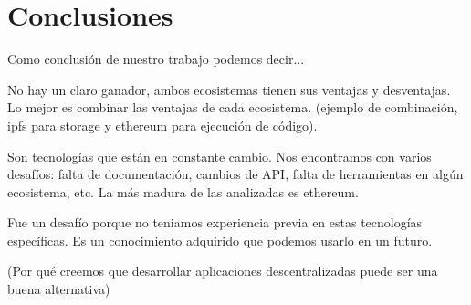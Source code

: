 \section{Conclusiones}

Como conclusión de nuestro trabajo podemos decir... 

No hay un claro ganador, ambos ecosistemas tienen sus ventajas y desventajas. Lo mejor es combinar las ventajas de cada ecosistema.
(ejemplo de combinación, ipfs para storage y ethereum para ejecución de código).

Son tecnologías que están en constante cambio. Nos encontramos con varios desafíos: falta de documentación, cambios de API, falta de herramientas en algún ecosistema, etc. La más madura de las analizadas es ethereum.

Fue un desafío porque no teniamos experiencia previa en estas tecnologías específicas. Es un conocimiento adquirido que podemos usarlo en un futuro. 

(Por qué creemos que desarrollar aplicaciones descentralizadas puede ser una buena alternativa)
